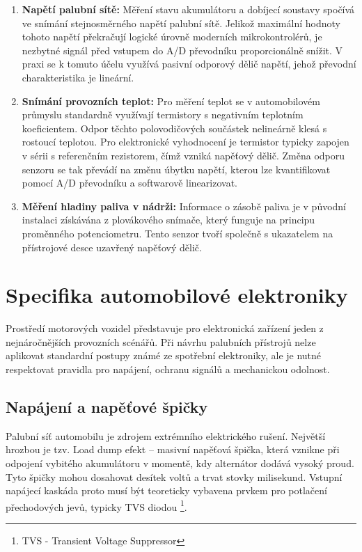 \begin{enumerate}
    \item \textbf{Napětí palubní sítě:} Měření stavu akumulátoru a dobíjecí soustavy spočívá ve snímání stejnosměrného napětí palubní sítě. 
    Jelikož maximální hodnoty tohoto napětí překračují logické úrovně moderních mikrokontrolérů, 
    je nezbytné signál před vstupem do A/D převodníku proporcionálně snížit. V praxi se k tomuto účelu využívá pasivní odporový dělič napětí, 
    jehož převodní charakteristika je lineární.
    \item \textbf{Snímání provozních teplot:} Pro měření teplot se v automobilovém průmyslu standardně využívají 
    termistory s negativním teplotním koeficientem. Odpor těchto polovodičových součástek nelineárně klesá s rostoucí teplotou. 
    Pro elektronické vyhodnocení je termistor typicky zapojen v sérii s referenčním rezistorem, čímž vzniká napěťový dělič. 
    Změna odporu senzoru se tak převádí na změnu úbytku napětí, kterou lze kvantifikovat pomocí A/D převodníku a softwarově linearizovat.
    \item \textbf{Měření hladiny paliva v nádrži:} Informace o zásobě paliva je v původní instalaci získávána z plovákového snímače, 
    který funguje na principu proměnného potenciometru. Tento senzor tvoří společně s ukazatelem na přístrojové desce uzavřený napěťový dělič. 
\end{enumerate}

\chapter{Specifika automobilové elektroniky}
Prostředí motorových vozidel představuje pro elektronická zařízení jeden z nejnáročnějších provozních scénářů. 
Při návrhu palubních přístrojů nelze aplikovat standardní postupy známé ze spotřební elektroniky, ale je nutné respektovat pravidla pro napájení, 
ochranu signálů a mechanickou odolnost.

\section{Napájení a napěťové špičky}
Palubní síť automobilu je zdrojem extrémního elektrického rušení. 
Největší hrozbou je tzv. Load dump efekt – masivní napěťová špička, která vznikne při odpojení vybitého akumulátoru v momentě, kdy alternátor dodává vysoký proud. 
Tyto špičky mohou dosahovat desítek voltů a trvat stovky milisekund. Vstupní napájecí kaskáda proto musí být teoreticky vybavena prvkem pro potlačení přechodových jevů, 
typicky TVS diodou \footnote{TVS - Transient Voltage Suppressor}.

